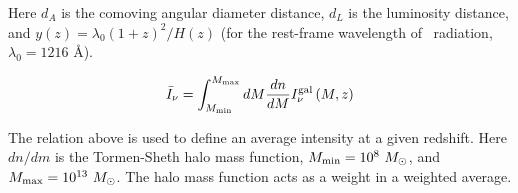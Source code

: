 Here $d_A$ is the comoving angular diameter distance, $d_L$ is the luminosity distance, and
$y \left( z \right) = \lambda_{0} \left( 1 + z\right)^2 / H \left(z \right)$ (for the rest-frame
wavelength of \lya\ radiation, $\lambda_0 = 1216$ \AA).

\begin{equation}
  \bar{I}_{\nu} = \int_{M_{\rm min}}^{M_{\rm max}} dM \frac{dn}{dM} I^{\rm gal}_{\nu} \left(M, z \right)
\end{equation}

The relation above is used to define an average intensity at a given redshift. Here $dn/dm$ is the
Tormen-Sheth halo mass function, $M_{\rm min} = 10^{8} \ M_{\odot}$, and $M_{\rm max} = 10^{13} \ M_{\odot}$.
The halo mass function acts as a weight in a weighted average.
